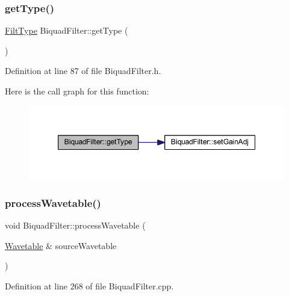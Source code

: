 \subsubsection{\texorpdfstring{get\+Type()}{getType()}}
{\footnotesize\ttfamily \hyperlink{class_biquad_filter_a173337ea2d17607e19495cf7b91f1110}{Filt\+Type} Biquad\+Filter\+::get\+Type (\begin{DoxyParamCaption}{ }\end{DoxyParamCaption})\hspace{0.3cm}{\ttfamily [inline]}}



Definition at line 87 of file Biquad\+Filter.\+h.

Here is the call graph for this function\+:
\nopagebreak
\begin{figure}[H]
\begin{center}
\leavevmode
\includegraphics[width=347pt]{d9/d6f/class_biquad_filter_ad77052398310ede2df2ba664259317d9_cgraph}
\end{center}
\end{figure}
\mbox{\label{class_biquad_filter_a205ea1f856a52f5d369d45cf385df801}} 
\subsubsection{\texorpdfstring{process\+Wavetable()}{processWavetable()}}
{\footnotesize\ttfamily void Biquad\+Filter\+::process\+Wavetable (\begin{DoxyParamCaption}\item[{\hyperlink{class_wavetable}{Wavetable} \&}]{source\+Wavetable }\end{DoxyParamCaption})}



Definition at line 268 of file Biquad\+Filter.\+cpp.

